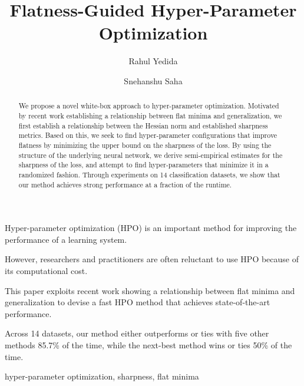 \documentclass[preprint,12pt]{elsarticle}
\begin{document}
\begin{frontmatter}

\title{Flatness-Guided Hyper-Parameter Optimization}

\author{Rahul Yedida}
            
\author{Snehanshu Saha}



\begin{abstract}
    We propose a novel white-box approach to hyper-parameter optimization. Motivated by recent work establishing a relationship between flat minima and generalization, we first establish a relationship between the Hessian norm and established sharpness metrics. Based on this, we seek to find hyper-parameter configurations that improve flatness by minimizing the upper bound on the sharpness of the loss. By using the structure of the underlying neural network, we derive semi-empirical estimates for the sharpness of the loss, and attempt to find hyper-parameters that minimize it in a randomized fashion. Through experiments on 14 classification datasets, we show that our method achieves strong performance at a fraction of the runtime.
\end{abstract}

\begin{highlights}
    \item Hyper-parameter optimization (HPO) is an important method for improving the performance of a learning system.
    \item However, researchers and practitioners are often reluctant to use HPO because of its computational cost.
    \item This paper exploits recent work showing a relationship between flat minima and generalization to devise a fast HPO method that achieves state-of-the-art performance.
    \item Across 14 datasets, our method either outperforms or ties with five other methods 85.7\% of the time, while the next-best method wins or ties 50\% of the time.
\end{highlights}

\begin{keyword}
hyper-parameter optimization, sharpness, flat minima
\end{keyword}
\end{frontmatter}
\end{document}
